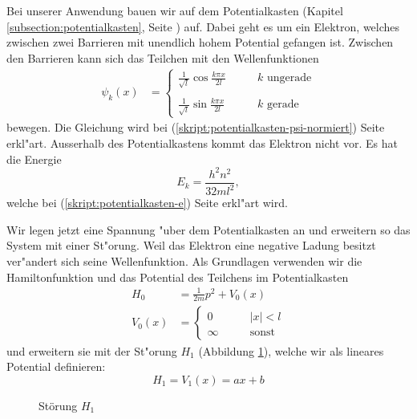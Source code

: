 \begin{refsection}
Bei unserer Anwendung bauen wir auf dem Potentialkasten (Kapitel \ref{subsection:potentialkasten}, Seite \pageref{subsection:potentialkasten}) auf.
Dabei geht es um ein Elektron, welches zwischen zwei Barrieren mit unendlich hohem Potential gefangen ist.
Zwischen den Barrieren kann sich das Teilchen mit den Wellenfunktionen
\begin{align}
\psi_k(x)
&=
\begin{cases}
\displaystyle
\frac{1}{\sqrt{l}}\cos\frac{k \pi x}{2l}&\qquad \text{$k$ ungerade}\\
\\
\displaystyle
\frac{1}{\sqrt{l}}\sin\frac{k \pi x}{2l}&\qquad \text{$k$ gerade}
\end{cases}
\end{align}
bewegen.
Die Gleichung wird bei (\ref{skript:potentialkasten-psi-normiert}) Seite \pageref{skript:potentialkasten-psi-normiert} erkl"art.
Ausserhalb des Potentialkastens kommt das Elektron nicht vor.
Es hat die Energie
\[
E_k = \frac{h^2n^2}{32ml^2},
\]
welche bei (\ref{skript:potentialkasten-e})
Seite \pageref{skript:potentialkasten-e} erkl"art wird.

Wir legen jetzt eine Spannung "uber dem Potentialkasten an
und erweitern so das System mit einer St"orung.
Weil das Elektron eine negative Ladung besitzt ver"andert sich seine Wellenfunktion.
Als Grundlagen verwenden wir die Hamiltonfunktion und das Potential des Teilchens im Potentialkasten
\begin{equation}
\begin{aligned}
H_0&=\frac1{2m}p^2+V_0(x)
\\
V_0(x)&=
  \begin{cases}
    0       & \qquad |x|<l\\
    \infty  & \qquad\text{sonst}
  \end{cases}
\end{aligned}
\end{equation}
und erweitern sie mit der St"orung $H_1$ (Abbildung \ref{abb:efeld_H_1}), welche wir als lineares 
Potential definieren:
\begin{equation}
	\label{eq:efeld_H_1}
  H_1 = V_1(x) = a x + b
\end{equation}

\begin{figure}
  \centering
{}
 \caption{St\"orung $H_1$}
 \label{abb:efeld_H_1}
\end{figure}


\end{refsection}
